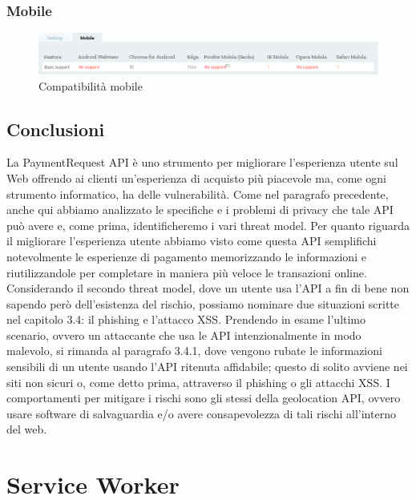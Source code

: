 \documentclass[11pt ,a4paper , twoside , openright ]{book}
\begin{document}
	\subsection{Mobile}
	\begin{figure}[h]
		\centering
		\includegraphics[width=1\linewidth]{Compatibilita2}
		\caption{Compatibilità mobile}
		\label{fig: Compatibilità mobile}
	\end{figure}
	\section{Conclusioni}
	La PaymentRequest API è uno strumento per migliorare l'esperienza utente sul Web offrendo ai clienti un'esperienza di acquisto più piacevole ma, come ogni strumento informatico, ha delle vulnerabilità.
	Come nel paragrafo precedente, anche qui abbiamo analizzato le specifiche e i problemi di privacy che tale API può avere e, come prima, identificheremo i vari threat model.
	Per quanto riguarda il migliorare l'esperienza utente abbiamo visto come questa API semplifichi notevolmente le esperienze di pagamento memorizzando le informazioni e riutilizzandole per completare in maniera più veloce le transazioni online. 
	Considerando il secondo threat model, dove un utente usa l'API a fin di bene non sapendo però dell'esistenza del rischio, possiamo nominare due situazioni scritte nel capitolo 3.4: il phishing e l'attacco XSS.
	Prendendo in esame l'ultimo scenario, ovvero un attaccante che usa le API intenzionalmente in modo malevolo, si rimanda al paragrafo 3.4.1, dove vengono rubate le informazioni sensibili di un utente usando l'API ritenuta affidabile; questo di solito avviene nei siti non sicuri o, come detto prima, attraverso il phishing o gli attacchi XSS.
	I comportamenti per mitigare i rischi sono gli stessi della geolocation API, ovvero usare software di salvaguardia e/o avere consapevolezza di tali rischi all'interno del web.
	\newpage
	
	\cleardoublepage
	\chapter{Service Worker}
\end{document}
